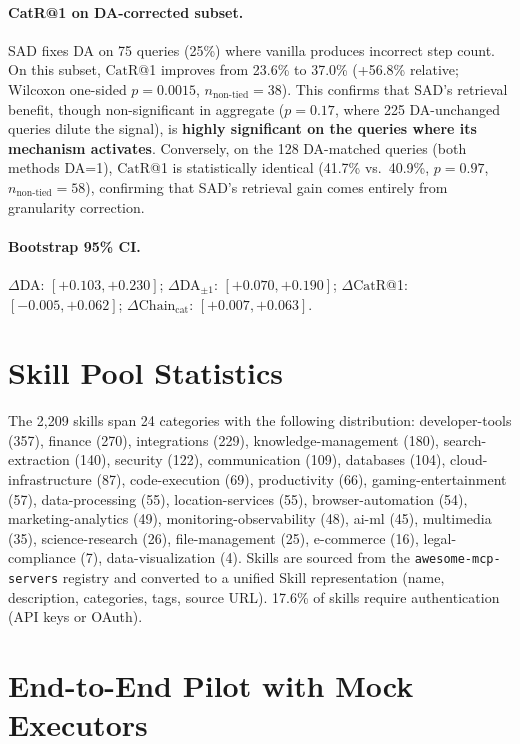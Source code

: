 \documentclass[11pt]{article}
\newcommand{\catrecall}{\text{CatR}}
\newcommand{\chaincat}{\text{Chain}_\text{cat}}
\begin{document}
\paragraph{CatR@1 on DA-corrected subset.}
SAD fixes DA on 75 queries (25\%) where vanilla produces incorrect step count.
On this subset, $\catrecall$@1 improves from 23.6\% to 37.0\% (+56.8\% relative; Wilcoxon one-sided $p{=}0.0015$, $n_{\text{non-tied}}{=}38$).
This confirms that SAD's retrieval benefit, though non-significant in aggregate ($p{=}0.17$, where 225 DA-unchanged queries dilute the signal), is \textbf{highly significant on the queries where its mechanism activates}.
Conversely, on the 128 DA-matched queries (both methods DA=1), $\catrecall$@1 is statistically identical (41.7\% vs.\ 40.9\%, $p{=}0.97$, $n_{\text{non-tied}}{=}58$), confirming that SAD's retrieval gain comes entirely from granularity correction.

\paragraph{Bootstrap 95\% CI.}
$\Delta$DA: $[+0.103, +0.230]$; $\Delta$DA$_{\pm 1}$: $[+0.070, +0.190]$; $\Delta\catrecall$@1: $[-0.005, +0.062]$; $\Delta\chaincat$: $[+0.007, +0.063]$.

\section{Skill Pool Statistics}
\label{app:pool-stats}

The 2{,}209 skills span 24 categories with the following distribution: developer-tools (357), finance (270), integrations (229), knowledge-management (180), search-extraction (140), security (122), communication (109), databases (104), cloud-infrastructure (87), code-execution (69), productivity (66), gaming-entertainment (57), data-processing (55), location-services (55), browser-automation (54), marketing-analytics (49), monitoring-observability (48), ai-ml (45), multimedia (35), science-research (26), file-management (25), e-commerce (16), legal-compliance (7), data-visualization (4).
Skills are sourced from the \texttt{awesome-mcp-servers} registry and converted to a unified Skill representation (name, description, categories, tags, source URL).
17.6\% of skills require authentication (API keys or OAuth).

\section{End-to-End Pilot with Mock Executors}
\label{app:execution}
\end{document}
